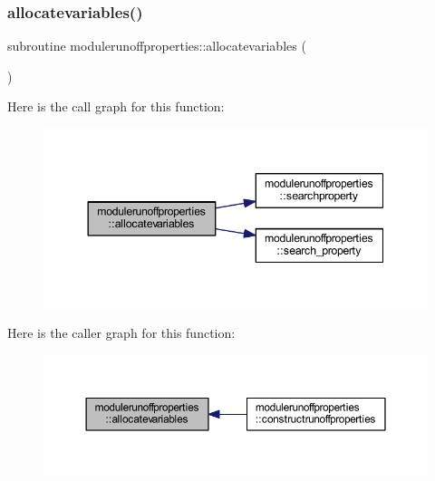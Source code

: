 \subsubsection{\texorpdfstring{allocatevariables()}{allocatevariables()}}
{\footnotesize\ttfamily subroutine modulerunoffproperties\+::allocatevariables (\begin{DoxyParamCaption}{ }\end{DoxyParamCaption})\hspace{0.3cm}{\ttfamily [private]}}

Here is the call graph for this function\+:\nopagebreak
\begin{figure}[H]
\begin{center}
\leavevmode
\includegraphics[width=344pt]{namespacemodulerunoffproperties_a2e51076442e9337406704c9d257c24cb_cgraph}
\end{center}
\end{figure}
Here is the caller graph for this function\+:\nopagebreak
\begin{figure}[H]
\begin{center}
\leavevmode
\includegraphics[width=350pt]{namespacemodulerunoffproperties_a2e51076442e9337406704c9d257c24cb_icgraph}
\end{center}
\end{figure}
\mbox{\label{namespacemodulerunoffproperties_a23224aa9dab3db29383ab466a5695a17}} 

